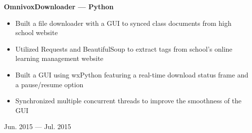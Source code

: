 \documentclass[9pt]{extarticle}
\begin{document}
\begin{minipage}[t]{.80\linewidth}
\begin{flushleft}
\textbf{OmnivoxDownloader --- Python}
\begin{itemize}
    \item Built a file downloader with a GUI to synced class documents
        from high school website
    \item Utilized Requests and BeautifulSoup to
        extract tags from school's online learning management website
    \item Built a GUI using wxPython featuring
        a real-time download status frame and a pause/resume option
    \item Synchronized multiple concurrent threads to improve the smoothness
        of the GUI
\end{itemize}


\end{flushleft}
\end{minipage}
\hfill
\begin{minipage}[t]{.19\linewidth}
\begin{flushright}
Jun. 2015 --- Jul. 2015
\end{flushright}
\end{minipage}






\end{document}
